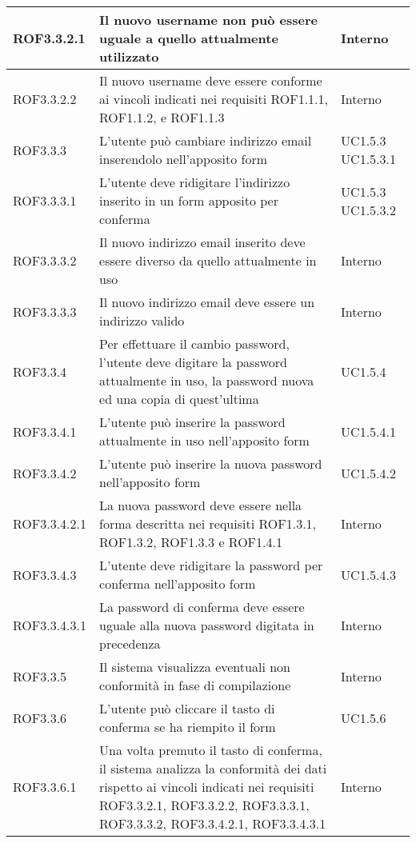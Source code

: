 \begin{center}
\begin{longtable}{| p{2.5cm} | p{8cm} | p{2cm} |}
		\hline
		ROF3.3.2.1  &  Il nuovo username non può essere uguale a quello attualmente utilizzato  &  Interno \\
		\hline
		ROF3.3.2.2  &  Il nuovo username deve essere conforme ai vincoli indicati nei requisiti ROF1.1.1, ROF1.1.2,  e ROF1.1.3  &  Interno \\
		\hline
		ROF3.3.3  &  L'utente può cambiare indirizzo email inserendolo nell'apposito form  &  UC1.5.3 \newline UC1.5.3.1  \\
		\hline
		ROF3.3.3.1  &  L'utente deve ridigitare l'indirizzo inserito in un form apposito per conferma  &  UC1.5.3 \newline UC1.5.3.2  \\
		\hline
		ROF3.3.3.2  &  Il nuovo indirizzo email inserito deve essere diverso da quello attualmente in uso  &  Interno \\
		\hline
		ROF3.3.3.3  &  Il nuovo indirizzo email deve essere un indirizzo valido  &  Interno \\
		\hline
		ROF3.3.4  &  Per effettuare il cambio password, l'utente deve digitare la password attualmente in uso, la password nuova ed una copia di quest'ultima  &  UC1.5.4 \\
		\hline
		ROF3.3.4.1  &  L'utente può inserire la password attualmente in uso nell'apposito form  &  UC1.5.4.1 \\
		\hline
		ROF3.3.4.2  &  L'utente può inserire la nuova password nell'apposito form  &  UC1.5.4.2 \\
		\hline
		ROF3.3.4.2.1  &  La nuova password deve essere nella forma descritta nei requisiti ROF1.3.1, ROF1.3.2, ROF1.3.3 e ROF1.4.1  &  Interno \\
		\hline
		ROF3.3.4.3  &  L'utente deve ridigitare la password per conferma nell'apposito form  &  UC1.5.4.3 \\
		\hline
		ROF3.3.4.3.1  &  La password di conferma deve essere uguale alla nuova password digitata in precedenza  &  Interno \\
		\hline
		ROF3.3.5  &  Il sistema visualizza eventuali non conformità in fase di compilazione  &  Interno \\
		\hline
		ROF3.3.6  &  L'utente può cliccare il tasto di conferma se ha riempito il form  &  UC1.5.6 \\
		\hline
		ROF3.3.6.1  &  Una volta premuto il tasto di conferma, il sistema analizza la conformità dei dati rispetto ai vincoli indicati nei requisiti ROF3.3.2.1, ROF3.3.2.2, ROF3.3.3.1, ROF3.3.3.2, ROF3.3.4.2.1, ROF3.3.4.3.1  &  Interno \\

\end{longtable}
\end{center}
